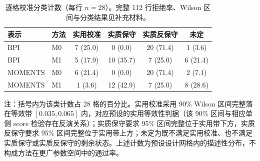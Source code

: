 \begin{table}[ht]
\centering
\footnotesize
\caption{逐格校准分类计数（每行 $n=28$）。完整 112 行拒绝率、Wilson 区间与分类结果见补充材料。}\label{tab:calibration}
\begin{tabular}{llcccc}
\toprule
表示 & 方法 & 实用校准 & 实质保守 & 实质反保守 & 未定\\
\midrule
BPI & M0 & 7 (25.0) & 0 (0.0) & 20 (71.4) & 1 (3.6)\\
BPI & M1 & 5 (17.9) & 10 (35.7) & 7 (25.0) & 6 (21.4)\\
MOMENTS & M0 & 6 (21.4) & 0 (0.0) & 20 (71.4) & 2 (7.1)\\
MOMENTS & M1 & 1 (3.6) & 12 (42.9) & 7 (25.0) & 8 (28.6)\\
\bottomrule
\end{tabular}

\begin{minipage}{0.94\textwidth}
\vspace{0.4em}
\footnotesize 注：括号内为该类计数占 28 格的百分比。实用校准采用 90\% Wilson 区间完整落在等效带 $[0.035,0.065]$ 内，对应预设的实用等效性判据（该 90\% 区间与相应单侧 score 检验存在反演关系）；实质保守要求 95\% 区间完整位于实用带下方，实质反保守要求 95\% 区间完整位于实用带上方；未定为既不满足实用校准、也不满足实质保守或实质反保守的剩余状态。上述计数为预设设计网格内的描述性分布，不构成方法在更广参数空间中的通过率。
\end{minipage}
\end{table}
